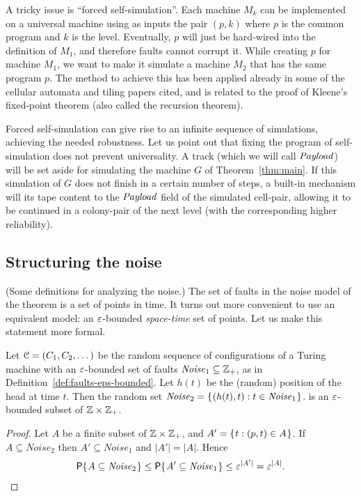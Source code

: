 \documentclass[11pt]{memoir}
\theoremstyle{definition} %
\renewcommand{\le}{\leq}
\newcommand{\fld}[1]{\ensuremath{\textit{#1\/}}}
\def\G{G} %
\newcommand{\Noise}{\mathit{Noise}}
\newcommand{\Payload}{\fld{Payload}}
\begin{document}
A tricky issue is ``forced self-simulation''.
Each machine \( M_{k} \) can be implemented on a universal machine using as inputs
the pair \( (p,k) \) where \( p \) is the common program and \( k \) is the level.
Eventually, \( p \) will just be hard-wired into the definition of \( M_{1} \),
and therefore faults cannot corrupt it.
While creating \( p \) for machine \( M_{1} \),
we want to make it simulate a machine \( M_{2} \) that has the same program \( p \).
The method to achieve this has been
applied already in some of the cellular automata and tiling papers cited, 
and is related to the proof of Kleene's fixed-point theorem (also called the recursion theorem).

Forced self-simulation can give rise to an infinite sequence of simulations, achieving
the needed robustness.
Let us point out that fixing the program of self-simulation does not prevent universality.
A track  (which we will call \( \Payload \)) will be set aside for simulating the machine
\( \G \) of Theorem~\ref{thm:main}.
If this simulation of \( \G \) does not finish in a certain number of steps,
a built-in mechanism will  its tape content to the \( \Payload \)
field of the simulated cell-pair, allowing it to be continued in a colony-pair of the next
level (with the corresponding higher reliability).

\subsection{Structuring the noise}\label{sec:sparsity-informal}

(Some definitions for analyzing the noise.)
The set of faults in the noise model of the theorem is a set of points in time.
It turns out more convenient to use an equivalent model:
an \( \varepsilon \)-bounded \emph{space-time} set of points.
Let us make this statement more formal.

\begin{lemma}\label{lem:space-time-noise}
  Let \( \mathcal{C}=(C_{1},C_{2},\dots) \) be the random sequence of configurations of a Turing machine
  with an \( \varepsilon \)-bounded set of faults \( \Noise_{1}\subseteq\bbZ_{+} \),
  as in Definition~\ref{def:faults-eps-bounded}.
  Let \( h(t) \) be the (random) position of the head at time \( t \).
  Then the random set \( \Noise_{2}=\setOf{(h(t),t)}{t\in\Noise_{1}} \).
is an \( \varepsilon \)-bounded subset of \( \mathbb{Z}\times\mathbb{Z}_{+} \).
\end{lemma}
\begin{proof}
  Let \( A \) be a finite subset of  \( \mathbb{Z}\times\mathbb{Z}_{+} \), and
  \( A' = \mathopen\{\mskip 1mu t : (p,t)\in A\mskip 1mu\mathclose\} \).
  If \( A\subseteq\Noise_{2} \) then \( A'\subseteq\Noise_{1} \) and \( |A'|=|A| \).
  Hence 
\begin{align*}
 \Pbof{A\subseteq\Noise_{2}}\le\Pbof{A'\subseteq\Noise_{1}}\le \eps^{|A'|}=\eps^{|A|} .
\end{align*}
\end{proof}
\end{document}
